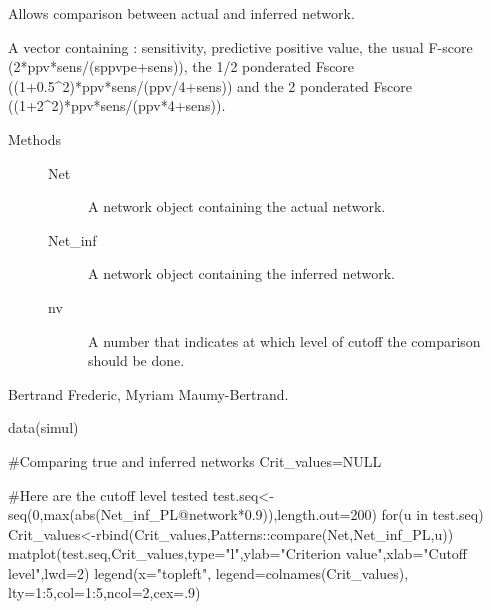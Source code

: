 \documentclass[a4paper]{book}
\begin{document}
%
\begin{Description}\relax
Allows comparison between actual and inferred network.
\end{Description}
%
\begin{Value}
A vector containing : sensitivity, predictive positive value, the usual F-score (2*ppv*sens/(sppvpe+sens)), the 1/2 ponderated Fscore ((1+0.5\textasciicircum{}2)*ppv*sens/(ppv/4+sens)) and the 2 ponderated Fscore ((1+2\textasciicircum{}2)*ppv*sens/(ppv*4+sens)).
\end{Value}
%
\begin{Section}{Methods}
\begin{description}


\item[] 
\begin{description}

\item[Net] 
A network object containing the actual network.

\item[Net\_inf] 
A network object containing the inferred network.

\item[nv] 
A number that indicates at which level of cutoff the comparison should be done.


\end{description}

                       


\end{description}

\end{Section}
%
\begin{Author}\relax
Bertrand Frederic, Myriam Maumy-Bertrand.
\end{Author}
%
\begin{Examples}
\begin{ExampleCode}
data(simul)

#Comparing true and inferred networks
Crit_values=NULL

#Here are the cutoff level tested
test.seq<-seq(0,max(abs(Net_inf_PL@network*0.9)),length.out=200)
for(u in test.seq){
	Crit_values<-rbind(Crit_values,Patterns::compare(Net,Net_inf_PL,u))
}
matplot(test.seq,Crit_values,type="l",ylab="Criterion value",xlab="Cutoff level",lwd=2)
legend(x="topleft", legend=colnames(Crit_values), lty=1:5,col=1:5,ncol=2,cex=.9)
\end{ExampleCode}
\end{Examples}
\end{document}
